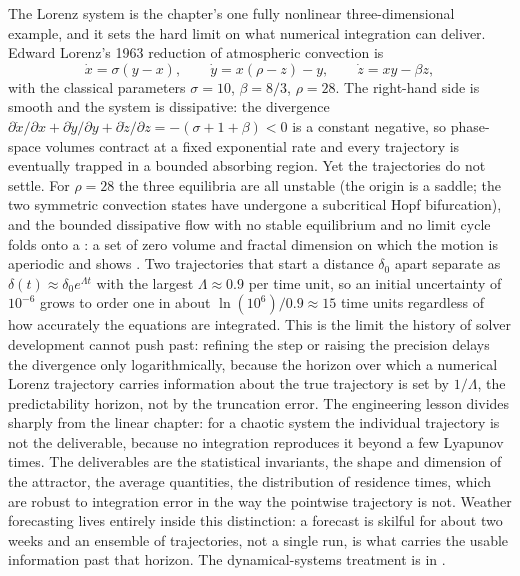 \begin{mastery}
The Lorenz system is the chapter's one fully nonlinear
three-dimensional example, and it sets the hard limit on what
numerical integration can deliver. Edward Lorenz's 1963 reduction of
atmospheric convection \cite{hist:v2c07-lorenz-1963} is
\[
\dot{x} = \sigma(y - x), \qquad
\dot{y} = x(\rho - z) - y, \qquad
\dot{z} = xy - \beta z,
\]
with the classical parameters $\sigma = 10$, $\beta = 8/3$,
$\rho = 28$. The right-hand side is smooth and the system is
dissipative: the divergence $\partial\dot{x}/\partial x +
\partial\dot{y}/\partial y + \partial\dot{z}/\partial z = -(\sigma + 1
+ \beta) < 0$ is a constant negative, so phase-space volumes contract
at a fixed exponential rate and every trajectory is eventually trapped
in a bounded absorbing region. Yet the trajectories do not settle. For
$\rho = 28$ the three equilibria are all unstable (the origin is a
saddle; the two symmetric convection states have undergone a subcritical
Hopf bifurcation), and the bounded dissipative flow with no stable
equilibrium and no limit cycle folds onto a : a set of zero volume and fractal dimension on which the
motion is aperiodic and shows . Two trajectories that start a distance $\delta_{0}$ apart
separate as $\delta(t) \approx \delta_{0} e^{\Lambda t}$ with the
largest  $\Lambda \approx 0.9$ per time
unit, so an initial uncertainty of $10^{-6}$ grows to order one in
about $\ln(10^{6})/0.9 \approx 15$ time units regardless of how
accurately the equations are integrated. This is the limit the history
of solver development cannot push past: refining the step or raising
the precision delays the divergence only logarithmically, because the
horizon over which a numerical Lorenz trajectory carries information
about the true trajectory is set by $1/\Lambda$, the predictability
horizon, not by the truncation error. The engineering lesson divides
sharply from the linear chapter: for a chaotic system the individual
trajectory is not the deliverable, because no integration reproduces
it beyond a few Lyapunov times. The deliverables are the statistical
invariants, the shape and dimension of the attractor, the average
quantities, the distribution of residence times, which are robust to
integration error in the way the pointwise trajectory is not. Weather
forecasting lives entirely inside this distinction: a forecast is
skilful for about two weeks and an ensemble of trajectories, not a
single run, is what carries the usable information past that horizon.
The dynamical-systems treatment is in
\textcite{text:v2ch07-strogatz-nonlinear}.
\end{mastery}

